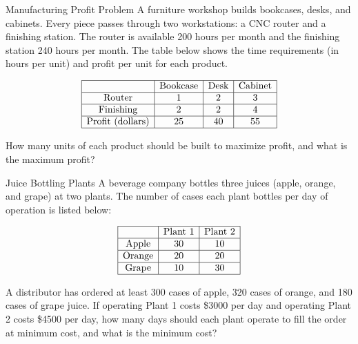 \begin{ex}{Manufacturing Profit Problem}{}
\label{ex:two-machine-profit}
 A furniture workshop builds bookcases, desks, and cabinets. Every piece passes through two workstations: a CNC router and a finishing station. The router is available 200 hours per month and the finishing station 240 hours per month. The table below shows the time requirements (in hours per unit) and profit per unit for each product.

\[
\begin{array}{|c|c|c|c|}
\hline
 & \text{Bookcase} & \text{Desk} & \text{Cabinet} \\
\hline
\text{Router} & 1 & 2 & 3 \\
\hline
\text{Finishing} & 2 & 2 & 4 \\
\hline
\text{Profit (dollars)} & 25 & 40 & 55 \\
\hline
\end{array}
\]
\par{}\label{tab:modeling-linear-programming-tab07}%


How many units of each product should be built to maximize profit, and what is the maximum profit?
\end{ex}

\begin{ex}{Juice Bottling Plants}{}
\label{ex:factory-days}
 A beverage company bottles three juices (apple, orange, and grape) at two plants. The number of cases each plant bottles per day of operation is listed below:

\[
\begin{array}{|c|c|c|}
\hline
 & \text{Plant 1} & \text{Plant 2} \\
\hline
\text{Apple} & 30 & 10 \\
\hline
\text{Orange} & 20 & 20 \\
\hline
\text{Grape} & 10 & 30 \\
\hline
\end{array}
\]
\par{}\label{tab:modeling-linear-programming-tab08}%


A distributor has ordered at least 300 cases of apple, 320 cases of orange, and 180 cases of grape juice. If operating Plant 1 costs \$3000 per day and operating Plant 2 costs \$4500 per day, how many days should each plant operate to fill the order at minimum cost, and what is the minimum cost?
\end{ex}

